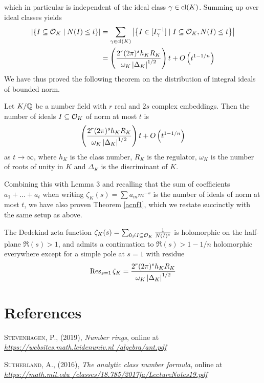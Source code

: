 \documentclass[11pt]{report}
\begin{document}
which in particular is independent of the ideal class $\gamma \in \operatorname{cl}(K)$. Summing up over ideal classes yields
\begin{align*}
    \left| \left\{  I \subseteq \mathcal{O}_K \mid N(I) \leq t  \right\} \right| &= \sum_{\gamma \in \operatorname{cl}(K)}\left| \left\{  I \in [I_{\gamma}^{-1}] \mid I \subseteq \mathcal{O}_K, N(I) \leq t  \right\} \right| \\ 
    &= \left(  \frac{2^r(2\pi)^s h_KR_K}{\omega_K \left| \Delta_K \right|^{1/2}}  \right)t + O\left(  t^{1 - 1/n}  \right)
\end{align*}
We have thus proved the following theorem on the distribution of integral ideals of bounded norm.
\begin{theorem}[]
    Let $K / \mathbb{Q}$ be a number field with $r$ real and $2s$ complex embeddings. Then the number of ideals $I \subseteq \mathcal{O}_K$ of norm at most $t$ is
    $$
        \left(  \frac{2^r(2\pi)^s h_KR_K}{\omega_K\left| \Delta_K \right|^{1/2}}  \right)t + O\left(  t^{1 - 1/n}  \right)
    $$
    as $t \to \infty$, where $h_K$ is the class number, $R_K$ is the regulator, $\omega_K$ is the number of roots of unity in $K$ and $\Delta_K$ is the discriminant of $K$.
\end{theorem}
Combining this with Lemma 3 and recalling that the sum of coefficients $a_1 + \ldots + a_t$ when writing $\zeta_K(s) = \sum a_mm^{-s}$ is the number of ideals of norm at most $t$, we have also proven Theorem \ref{acnf1}, which we restate succinctly with the same setup as above.
\begin{theorem}
    The Dedekind zeta function $\zeta_K(s) = \sum_{0 \neq I \subseteq \mathcal{O}_K} \frac{1}{N(I)^s}$ is holomorphic on the half-plane $\Re(s) > 1$, and admits a continuation to $\Re(s) > 1 - 1/n$ holomorphic everywhere except for a simple pole at $s = 1$ with residue
    $$
        \operatorname{Res}_{s = 1}\zeta_K = \frac{2^r(2\pi)^sh_KR_K}{\omega_K\left| \Delta_K \right|^{1/2}}
    $$
\end{theorem}

\chapter{References}
\begin{enum}
    \item \hypertarget{stevenhagen}{\textsc{Stevenhagen, P.}, (2019), \emph{Number rings}, online at \emph{\color{blue}\href{https://websites.math.leidenuniv.nl/algebra/ant.pdf}{https://websites.math.leidenuniv.nl /algebra/ant.pdf}\color{black}}}
    \item \hypertarget{sutherland}{\textsc{Sutherland, A.}, (2016), \emph{The analytic class number formula}, online at \emph{\color{blue}\href{https://math.mit.edu/classes/18.785/2017fa/LectureNotes19.pdf}{https://math.mit.edu /classes/18.785/2017fa/LectureNotes19.pdf}\color{black}}}
\end{enum}
\end{document}
